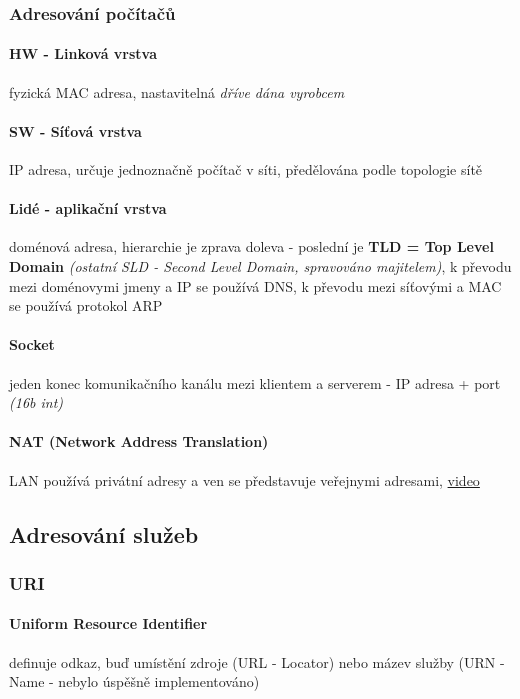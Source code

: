 \documentclass[10pt,a4paper]{article}
\begin{document}
\subsubsection{Adresování počítačů}

\paragraph{HW - Linková vrstva} fyzická MAC adresa, nastavitelná \textit{dříve dána vyrobcem}

\paragraph{SW - Síťová vrstva} IP adresa, určuje jednoznačně počítač v síti, předělována podle topologie sítě

\paragraph{Lidé - aplikační vrstva} doménová adresa, hierarchie je zprava doleva - poslední je \textbf{TLD = Top Level Domain} \textit{(ostatní SLD - Second Level Domain, spravováno majitelem)}, k převodu mezi doménovymi jmeny a IP se používá DNS, k převodu mezi síťovými a MAC se používá protokol ARP

\paragraph{Socket} jeden konec komunikačního kanálu mezi klientem a serverem - IP adresa + port \textit{(16b int)}

\paragraph{NAT (Network Address Translation)} LAN používá privátní adresy a ven se představuje veřejnymi adresami, \href{https://youtu.be/FTUV0t6JaDA}{video}

\subsection{Adresování služeb}

\subsubsection{URI}

\paragraph{Uniform Resource Identifier} definuje odkaz, buď umístění zdroje (URL - Locator) nebo mázev služby (URN - Name - nebylo úspěšně implementováno)
\end{document}
